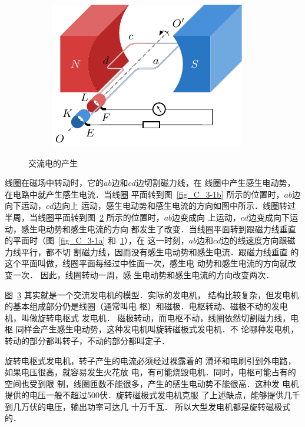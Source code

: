 \begin{figure}[htbp]
\begin{subfigure}{0.4\linewidth}
        \caption{}\label{fig_C_3-1c}
    \end{subfigure}
    \hfil
    \begin{subfigure}{0.4\linewidth}
        \centering
        \includegraphics{fig/C/3-1d.pdf}
        \caption{}\label{fig_C_3-1d}
    \end{subfigure}
    \caption{交流电的产生}\label{fig_C_3-1}
\end{figure}

线圈在磁场中转动时，它的$ab$边和$cd$边切割磁力线，在
线圈中产生感生电动势，在电路中就产生感生电流．当线圈
平面转到图~\ref{fig_C_3-1b} 所示的位置时，$ab$边向下运动，$cd$边向上
运动，感生电动势和感生电流的方向如图中所示．线圈转过
半周，当线圈平面转到图~\ref{fig_C_3-1d} 所示的位置时，$ab$边变成向
上运动，$cd$边变成向下运动，感生电动势和感生电流的方向
都发生了改变．当线圈平面转到跟磁力线垂直的平面时（图~\ref{fig_C_3-1a} 和~\ref{fig_C_3-1c}），在
这一时刻，$ab$边和$cd$边的线速度方向跟磁力线平行，都不切
割磁力线，因而没有感生电动势和感生电流．跟磁力线垂直
的这个平面叫做，线圈平面每经过中性面一次，感生电
动势和感生电流的方向就改变一次．
因此，线圈转动一周，感
生电动势和感生电流的方向改变两次．

图~\ref{fig_C_3-1} 其实就是一个交流发电机的模型．实际的发电机，
结构比较复杂，但发电机的基本组成部分仍是线圈（通常叫电
枢）和磁极．电枢转动、磁极不动的发电机，叫做旋转电枢式
发电机．
磁极转动，而电枢不动，线圈依然切割磁力线，电枢
同样会产生感生电动势，这种发电机叫旋转磁极式发电机．不
论哪种发电机，转动的部分都叫转子，不动的部分都叫定子．

旋转电枢式发电机，转子产生的电流必须经过裸露着的
滑环和电刷引到外电路，如果电压很高，就容易发生火花放
电，有可能烧毁电机．同时，电枢可能占有的空间也受到限
制，线圈匝数不能很多，产生的感生电动势不能很高．这种发
电机提供的电压一般不超过500伏．旋转磁极式发电机克服
了上述缺点，能够提供几千到几万伏的电压，输出功率可达几
十万千瓦．
所以大型发电机都是旋转磁极式的．

